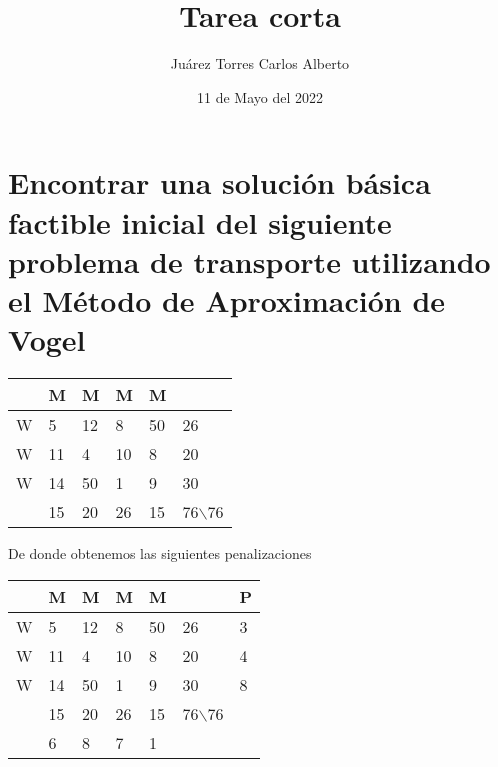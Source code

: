 \documentclass{article}
\title{Tarea corta}
\author{Juárez Torres Carlos Alberto}
\date{11 de Mayo del 2022}
\begin{document}
\maketitle

\section*{Encontrar una solución básica factible inicial del siguiente problema
de transporte utilizando el Método de Aproximación de Vogel}

\begin{center}
    \begin{tabular}{|l|l|l|l|l|l|}
\hline
\cellcolor[HTML]{67FD9A} & \cellcolor[HTML]{67FD9A}M & \cellcolor[HTML]{67FD9A}M & \cellcolor[HTML]{67FD9A}M & \cellcolor[HTML]{67FD9A}M &  \\ \hline
\cellcolor[HTML]{67FD9A}W & \cellcolor[HTML]{67FD9A}5 & \cellcolor[HTML]{67FD9A}12 & \cellcolor[HTML]{67FD9A}8 & \cellcolor[HTML]{67FD9A}50 & 26 \\ \hline
\cellcolor[HTML]{67FD9A}W & \cellcolor[HTML]{67FD9A}11 & \cellcolor[HTML]{67FD9A}4 & \cellcolor[HTML]{67FD9A}10 & \cellcolor[HTML]{67FD9A}8 & 20 \\ \hline
\cellcolor[HTML]{67FD9A}W & \cellcolor[HTML]{67FD9A}14 & \cellcolor[HTML]{67FD9A}50 & \cellcolor[HTML]{67FD9A}1 & \cellcolor[HTML]{67FD9A}9 & 30 \\ \hline
 & 15 & 20 & 26 & 15 & 76$\backslash$76 \\ \hline
\end{tabular}
\end{center}
De donde obtenemos las siguientes penalizaciones
\begin{center}
\begin{tabular}{|l|l|l|l|l|l|l|}
\hline
 & M & M & M & M &  & P \\ \hline
W & \cellcolor[HTML]{34FF34}5 & \cellcolor[HTML]{34FF34}12 & \cellcolor[HTML]{34FF34}8 & \cellcolor[HTML]{34FF34}50 & 26 & 3 \\ \hline
W & \cellcolor[HTML]{34FF34}11 & \cellcolor[HTML]{34FF34}4 & \cellcolor[HTML]{34FF34}10 & \cellcolor[HTML]{34FF34}8 & 20 & 4 \\ \hline
W & \cellcolor[HTML]{34FF34}14 & \cellcolor[HTML]{34FF34}50 & \cellcolor[HTML]{34FF34}1 & \cellcolor[HTML]{34FF34}9 & 30 & \cellcolor[HTML]{CB0000}8 \\ \hline
 & \cellcolor[HTML]{34FF34}15 & \cellcolor[HTML]{34FF34}20 & \cellcolor[HTML]{34FF34}26 & \cellcolor[HTML]{34FF34}15 & 76$\backslash$76 &  \\ \hline
 & 6 & 8 & 7 & 1 &  &  \\ \hline
\end{tabular}
\end{center}
\end{document}
